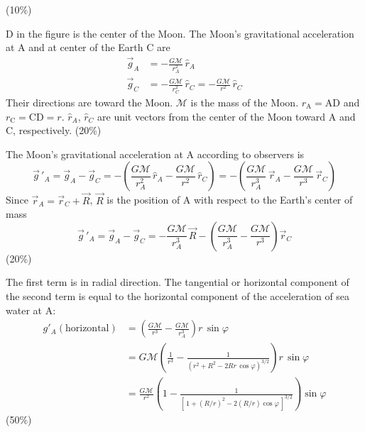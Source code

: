 \hfill(10\%)

D in the figure is the center of the Moon. The Moon's gravitational
acceleration at A and at center of the Earth C are
\begin{align*}
  \vec{g}_A &= -\frac{G\mathcal{M}}{r_A^2}\,\hat{r}_A \\
  \vec{g}_C &= -\frac{G\mathcal{M}}{r_C^2}\,\hat{r}_C
             = -\frac{G\mathcal{M}}{r^2}\,\hat{r}_C
\end{align*}
Their directions are toward the Moon. $\mathcal{M}$ is the mass of the Moon.
$r_{\mathrm{A}} = \mathrm{AD}$ and $r_{\mathrm{C}} = \mathrm{CD} = r$.
$\hat{r}_A$, $\hat{r}_C$ are unit vectors from the center of the Moon toward
A and C, respectively. \hfill(20\%)

The Moon's gravitational acceleration at A according to observers is
\[
  \vec{g}\,'_A = \vec{g}_A - \vec{g}_C
  = -\left( \frac{G\mathcal{M}}{r_A^2}\,\hat{r}_A
          - \frac{G\mathcal{M}}{r^2}\,\hat{r}_C \right)
  = -\left( \frac{G\mathcal{M}}{r_A^3}\,\vec{r}_A
          - \frac{G\mathcal{M}}{r^3}\,\vec{r}_C \right)
\]
Since $\vec{r}_A = \vec{r}_C + \vec{R}$, $\vec{R}$ is the position of A with
respect to the Earth's center of mass
\[
  \vec{g}\,'_A = \vec{g}_A - \vec{g}_C
  = -\frac{G\mathcal{M}}{r_A^3}\,\vec{R}
    - \left( \frac{G\mathcal{M}}{r_A^3}
           - \frac{G\mathcal{M}}{r^3} \right)\vec{r}_C
\]
\hfill(20\%)

The first term is in radial direction. The tangential or horizontal component
of the second term is equal to the horizontal component of the acceleration of
sea water at A:
\begin{align*}
  g'_A(\text{horizontal})
  &= \left( \frac{G\mathcal{M}}{r^3} - \frac{G\mathcal{M}}{r_A^3} \right)
     r\,\sin\varphi \\
  &= G\mathcal{M}\left( \frac{1}{r^3}
     - \frac{1}{(r^2 + R^2 - 2Rr\,\cos\varphi)^{3/2}} \right) r\,\sin\varphi \\
  &= \frac{G\mathcal{M}}{r^2}\left( 1
     - \frac{1}{[\,1 + (R/r)^2 - 2(R/r)\cos\varphi\,]^{3/2}} \right)\sin\varphi
\end{align*}
\hfill(50\%)
